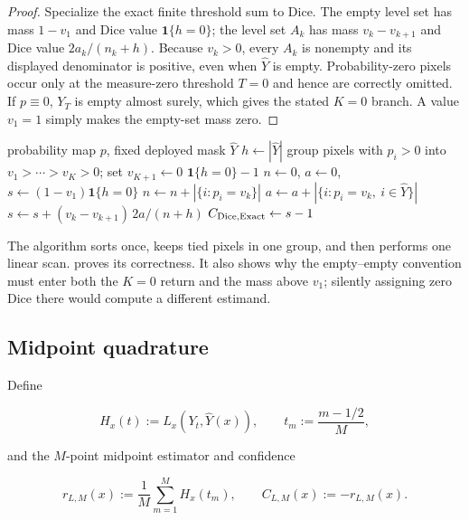 \begin{proof}
Specialize the exact finite threshold sum to Dice. The empty level set has mass
$1-v_1$ and Dice value $\mathbf 1\{h=0\}$; the level set $A_k$ has mass
$v_k-v_{k+1}$ and Dice value $2a_k/(n_k+h)$. Because $v_k>0$, every
$A_k$ is nonempty and its displayed denominator is positive, even when
$\widehat Y$ is empty. Probability-zero pixels occur only at the measure-zero
threshold $T=0$ and hence are correctly omitted. If $p\equiv0$, $Y_T$ is empty
almost surely, which gives the stated $K=0$ branch. A value $v_1=1$ simply makes
the empty-set mass zero.
\end{proof}

\begin{algorithm}[t]
\caption{Exact uniform-level-set Dice confidence}
\label{app:alg:exact-dice}
\small
\begin{algorithmic}[1]
\Require probability map $p$, fixed deployed mask $\widehat Y$
\State $h\gets|\widehat Y|$
\State group pixels with $p_i>0$ into $v_1>\cdots>v_K>0$; set $v_{K+1}\gets0$
  \State \Return $\mathbf 1\{h=0\}-1$
\EndIf
\State $n\gets0$, $a\gets0$, $s\gets(1-v_1)\mathbf 1\{h=0\}$
  \State $n\gets n+|\{i:p_i=v_k\}|$
  \State $a\gets a+|\{i:p_i=v_k,\ i\in\widehat Y\}|$
  \State $s\gets s+(v_k-v_{k+1})\,2a/(n+h)$
\EndFor
\State \Return $C_{\operatorname{Dice},\mathrm{Exact}}\gets s-1$
\end{algorithmic}
\end{algorithm}

The algorithm sorts once, keeps tied pixels in one group, and then performs one
linear scan.  proves its correctness. It also
shows why the empty--empty convention must enter both the $K=0$ return and the
mass above $v_1$; silently assigning zero Dice there would compute a different
estimand.

\subsection{Midpoint quadrature}

Define

\begin{equation*}
  H_x(t):=L_x(Y_t,\widehat Y(x)),
  \qquad
  t_m:=\frac{m-1/2}{M},
\end{equation*}

and the $M$-point midpoint estimator and confidence

\begin{equation*}
  r_{L,M}(x):=\frac1M\sum_{m=1}^M H_x(t_m),
  \qquad
  C_{L,M}(x):=-r_{L,M}(x).
\end{equation*}

